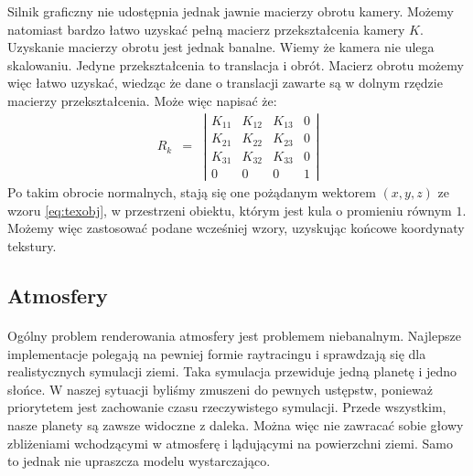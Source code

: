 Silnik graficzny nie udostępnia jednak jawnie macierzy obrotu kamery. Możemy natomiast bardzo łatwo uzyskać pełną macierz przekształcenia kamery $K$. Uzyskanie macierzy obrotu jest jednak banalne. Wiemy że kamera nie ulega skalowaniu. Jedyne przekształcenia to translacja i obrót. Macierz obrotu możemy więc łatwo uzyskać, wiedząc że dane o translacji zawarte są w dolnym rzędzie macierzy przekształcenia. Może więc napisać że:
\begin{eqnarray}
R_k &=&  
\left| \begin{array}{cccc}
K_{11} & K_{12} & K_{13} & 0 \\ 
K_{21} & K_{22} & K_{23} & 0 \\
K_{31} & K_{32} & K_{33} & 0 \\
0 & 0 & 0 & 1 
\end{array} \right|
\end{eqnarray}
Po takim obrocie normalnych, stają się one pożądanym wektorem $(x,y,z)$ ze wzoru \hyperref[eq:texobj]{\ref{eq:texobj}}, w przestrzeni obiektu, którym jest kula o promieniu równym $1$. Możemy więc zastosować podane wcześniej wzory, uzyskując końcowe koordynaty tekstury.

\subsection{Atmosfery}\label{sub:atmosfery}
\paragraph{}

Ogólny problem renderowania atmosfery jest problemem niebanalnym. Najlepsze implementacje polegają na pewniej formie raytracingu i sprawdzają się dla realistycznych symulacji ziemi. Taka symulacja przewiduje jedną planetę i jedno słońce. W naszej sytuacji byliśmy zmuszeni do pewnych ustępstw, ponieważ priorytetem jest zachowanie czasu rzeczywistego symulacji. Przede wszystkim, nasze planety są zawsze widoczne z daleka. Można więc nie zawracać sobie głowy zbliżeniami wchodzącymi w atmosferę i lądującymi na powierzchni ziemi. Samo to jednak nie upraszcza modelu wystarczająco.

\paragraph{}

